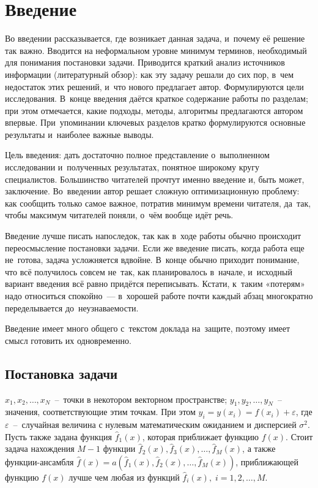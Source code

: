 \documentclass[12pt, fleqn]{article}
\newcommand{\predictionfunction}{\hat{f}}
\newcommand{\ensemblefunction}{a}
\newcommand{\numberobjects}{N}
\newcommand{\numberpredictionfunctions}{M}
\newcommand{\many}[3]{#1 1 #2, #1 2 #2, \dots, #1 #3 #2}  %
\newcommand{\ensemblefunctionfull}{\ensemblefunction(\many{\predictionfunction_}{(x)}{\numberpredictionfunctions})}
\begin{document}
\newpage
\section{Введение}

Во введении рассказывается, где возникает данная задача, и~почему её решение так важно.
Вводится на неформальном уровне минимум терминов, необходимый для понимания постановки задачи.
Приводится краткий анализ источников информации (литературный обзор):
как эту задачу решали до сих пор, в~чем недостаток этих решений, и~что нового предлагает автор.
Формулируются цели исследования. 
В~конце введения даётся краткое содержание работы по разделам; 
при этом отмечается, какие подходы, методы, алгоритмы предлагаются автором впервые. 
При~упоминании ключевых разделов кратко формулируются основные результаты и~наиболее важные выводы.

Цель введения: дать достаточно полное представление о~выполненном исследовании 
и~полученных результатах, понятное широкому кругу специалистов. 
Большинство читателей прочтут именно введение и, быть может, заключение. 
Во~введении автор решает сложную оптимизационную проблему: 
как сообщить только самое важное, потратив минимум времени читателя,
да~так, чтобы максимум читателей поняли, о~чём вообще идёт речь.

Введение лучше писать напоследок, так как в~ходе работы обычно происходит переосмысление постановки задачи.
Если же введение писать, когда работа еще не~готова, задача усложняется вдвойне.
В~конце обычно приходит понимание, что всё получилось совсем не~так, как планировалось в~начале,
и~исходный вариант введения всё равно придётся переписывать. 
Кстати, к~таким «потерям» надо относиться спокойно~--- в~хорошей работе почти каждый абзац многократно переделывается до~неузнаваемости.
 
Введение имеет много общего с~текстом доклада на~защите, поэтому имеет смысл готовить их одновременно.

\subsection{Постановка задачи}

$\many{x_}{}{\numberobjects}$~--~точки в некотором векторном пространстве; $\many{y_}{}{\numberobjects}$~--~ значения, соответствующие этим точкам. При этом $y_i = y(x_i) = f(x_i) + \varepsilon$, где $\varepsilon$~--~случайная величина с нулевым математическим ожиданием и дисперсией $\sigma^2$. Пусть также задана функция $\predictionfunction_1(x)$, которая приближает функцию $f(x)$. Стоит задача нахождения $\numberpredictionfunctions - 1$ функции $\predictionfunction_2(x), \predictionfunction_3(x), \dots, \predictionfunction_\numberpredictionfunctions(x)$, а также функции-ансамбля $\predictionfunction(x) = \ensemblefunctionfull$, приближающей функцию $f(x)$ лучше чем любая из функций $\predictionfunction_i(x), \; i = \many{}{}{\numberpredictionfunctions}$.
\end{document}
